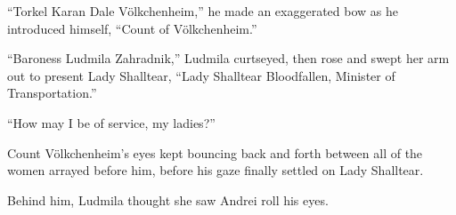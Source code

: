  

“Torkel Karan Dale Völkchenheim,” he made an exaggerated bow as he introduced himself, “Count of Völkchenheim.”

 

“Baroness Ludmila Zahradnik,” Ludmila curtseyed, then rose and swept her arm out to present Lady Shalltear, “Lady Shalltear Bloodfallen, Minister of Transportation.”

 

“How may I be of service, my ladies?”

 

Count Völkchenheim’s eyes kept bouncing back and forth between all of the women arrayed before him, before his gaze finally settled on Lady Shalltear.

 

Behind him, Ludmila thought she saw Andrei roll his eyes.